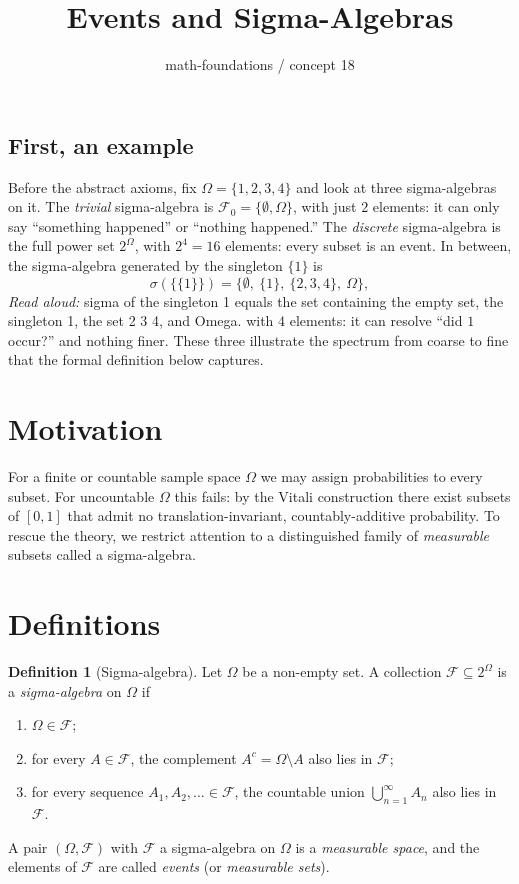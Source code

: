 \documentclass[11pt]{article}
\title{Events and Sigma-Algebras}
\author{math-foundations / concept 18}
\date{}
\theoremstyle{definition}
\newtheorem{definition}[theorem]{Definition}
\begin{document}
\maketitle

\subsection*{First, an example}

Before the abstract axioms, fix $\Omega = \{1, 2, 3, 4\}$ and look at three sigma-algebras on it. The \emph{trivial} sigma-algebra is $\mathcal{F}_{0} = \{\emptyset, \Omega\}$, with just $2$ elements: it can only say ``something happened'' or ``nothing happened.'' The \emph{discrete} sigma-algebra is the full power set $2^{\Omega}$, with $2^{4} = 16$ elements: every subset is an event. In between, the sigma-algebra generated by the singleton $\{1\}$ is
\[
\sigma(\{\{1\}\}) = \{\emptyset,\ \{1\},\ \{2,3,4\},\ \Omega\},
\]
\emph{Read aloud:} sigma of the singleton 1 equals the set containing the empty set, the singleton 1, the set 2 3 4, and Omega.
with $4$ elements: it can resolve ``did $1$ occur?'' and nothing finer. These three illustrate the spectrum from coarse to fine that the formal definition below captures.

\section{Motivation}

For a finite or countable sample space $\Omega$ we may assign probabilities to every subset. For uncountable $\Omega$ this fails: by the Vitali construction there exist subsets of $[0,1]$ that admit no translation-invariant, countably-additive probability. To rescue the theory, we restrict attention to a distinguished family of \emph{measurable} subsets called a sigma-algebra.

\section{Definitions}

\begin{definition}[Sigma-algebra]
Let $\Omega$ be a non-empty set. A collection $\mathcal{F} \subseteq 2^{\Omega}$ is a \emph{sigma-algebra} on $\Omega$ if
\begin{enumerate}
    \item[(S1)] $\Omega \in \mathcal{F}$;
    \item[(S2)] for every $A \in \mathcal{F}$, the complement $A^{c} = \Omega \setminus A$ also lies in $\mathcal{F}$;
    \item[(S3)] for every sequence $A_{1}, A_{2}, \ldots \in \mathcal{F}$, the countable union $\bigcup_{n=1}^{\infty} A_{n}$ also lies in $\mathcal{F}$.
\end{enumerate}
A pair $(\Omega, \mathcal{F})$ with $\mathcal{F}$ a sigma-algebra on $\Omega$ is a \emph{measurable space}, and the elements of $\mathcal{F}$ are called \emph{events} (or \emph{measurable sets}).
\end{definition}
\end{document}
